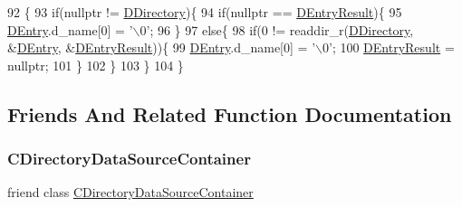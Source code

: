 \begin{DoxyCode}
92                                                 \{
93     \textcolor{keywordflow}{if}(\textcolor{keyword}{nullptr} != \hyperlink{classCDirectoryDataSourceContainerIterator_a0e07044b1a916e3dd931ae0778317e16}{DDirectory})\{
94         \textcolor{keywordflow}{if}(\textcolor{keyword}{nullptr} == \hyperlink{classCDirectoryDataSourceContainerIterator_a7e8c1c50ef09013ee6013dcbd1bdc616}{DEntryResult})\{
95             \hyperlink{classCDirectoryDataSourceContainerIterator_a69dfb8a9f2ab7f71e7d106d4d6c0e29b}{DEntry}.d\_name[0] = \textcolor{charliteral}{'\(\backslash\)0'};   
96         \}
97         \textcolor{keywordflow}{else}\{
98             \textcolor{keywordflow}{if}(0 != readdir\_r(\hyperlink{classCDirectoryDataSourceContainerIterator_a0e07044b1a916e3dd931ae0778317e16}{DDirectory}, &\hyperlink{classCDirectoryDataSourceContainerIterator_a69dfb8a9f2ab7f71e7d106d4d6c0e29b}{DEntry}, &\hyperlink{classCDirectoryDataSourceContainerIterator_a7e8c1c50ef09013ee6013dcbd1bdc616}{DEntryResult}))\{
99                 \hyperlink{classCDirectoryDataSourceContainerIterator_a69dfb8a9f2ab7f71e7d106d4d6c0e29b}{DEntry}.d\_name[0] = \textcolor{charliteral}{'\(\backslash\)0'};
100                 \hyperlink{classCDirectoryDataSourceContainerIterator_a7e8c1c50ef09013ee6013dcbd1bdc616}{DEntryResult} = \textcolor{keyword}{nullptr};
101             \}
102         \}
103     \}
104 \}
\end{DoxyCode}


\subsection{Friends And Related Function Documentation}
\hypertarget{classCDirectoryDataSourceContainerIterator_ab421e385625629f6c45d70648a928574}{}\label{classCDirectoryDataSourceContainerIterator_ab421e385625629f6c45d70648a928574} 
\subsubsection{\texorpdfstring{C\+Directory\+Data\+Source\+Container}{CDirectoryDataSourceContainer}}
{\footnotesize\ttfamily friend class \hyperlink{classCDirectoryDataSourceContainer}{C\+Directory\+Data\+Source\+Container}\hspace{0.3cm}{\ttfamily [friend]}}



